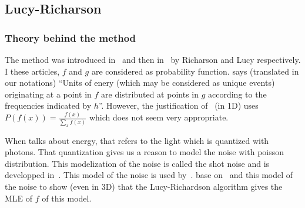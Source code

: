 \subsection{Lucy-Richarson}
\subsubsection{Theory behind the method}
The method was introduced in~\cite{richardson1972bayesian} and
then in~\cite{lucy1974iterative} by Richarson and Lucy respectively.
I these articles, $f$ and $g$ are considered as probability function.
\cite{richardson1972bayesian} says (translated in our notations)
``Units of enery (which may be considered as unique events)
originating at a point in $f$ are distributed at points in $g$
according to the frequencies indicated by $h$''.
However, the justification of~\cite{richardson1972bayesian} (in 1D) uses
$P(f(x)) = \frac{f(x)}{\sum_x f(x)}$ which does not seem
very appropriate.

When \cite{richardson1972bayesian} talks about energy,
that refers to the light which is quantized with photons.
That quantization gives us a reason to model the noise with
poisson distribution.
This modelization of the noise is called the shot noise and
is developped in~\cite{blanter2000shot}.
This model of the noise is used by~\cite{hebert1989generalized}.
\cite{temerinac2010tile} base on~\cite{hebert1989generalized}
and this model of the noise to show (even in 3D)
that the Lucy-Richardson algorithm gives the MLE of $f$ of this
model.


